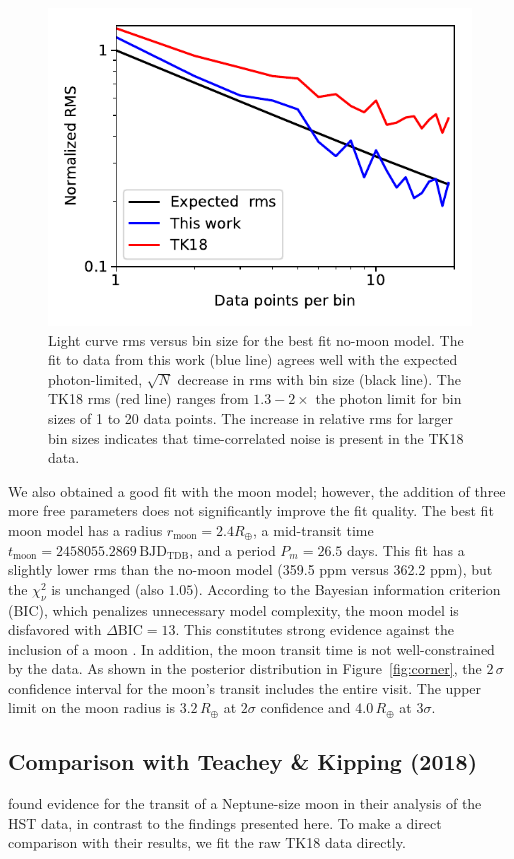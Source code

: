 \documentclass[twocolumn]{aastex62}
\begin{document}
\begin{figure}
\includegraphics[width = 0.5 \textwidth]{figures/fig2_rms.pdf}
    \caption{Light curve rms versus bin size for the best fit no-moon model. The fit to data from this work (blue line) agrees well with the expected photon-limited, $\sqrt{N}$ decrease in rms with bin size (black line). The TK18 rms (red line) ranges from $1.3 - 2\times$ the photon limit for bin sizes of 1 to 20 data points. The increase in relative rms for larger bin sizes indicates that time-correlated noise is present in the TK18 data.}
\label{fig:rms}
\end{figure}

We also obtained a good fit with the moon model; however, the addition of three more free parameters does not significantly improve the fit quality. The best fit moon model has a radius $r_\mathrm{moon} = 2.4R_\oplus$, a mid-transit time $t_\mathrm{moon} = 2458055.2869\,\mathrm{BJD_{TDB}}$, and a period $P_m = 26.5$ days. This fit has a slightly lower rms than the no-moon model (359.5 ppm versus 362.2 ppm), but the $\chi_\nu^2$ is unchanged (also $1.05$). According to the Bayesian information criterion (BIC), which penalizes unnecessary model complexity, the moon model is disfavored with $\Delta\mathrm{BIC} = 13$. This constitutes strong evidence against the inclusion of a moon \citep{kass95}.  In addition, the moon transit time is not well-constrained by the data. As shown in the posterior distribution in Figure~\ref{fig:corner}, the $2\,\sigma$ confidence interval for the moon's transit includes the entire visit.  The upper limit on the moon radius is $3.2\,R_\oplus$ at $2\sigma$ confidence and $4.0\,R_\oplus$ at $3\sigma$.

\subsection{Comparison with Teachey \& Kipping (2018)}
\cite{teachey18b} found evidence for the transit of a Neptune-size moon in their analysis of the HST data, in contrast to the findings presented here.  To make a direct comparison with their results, we fit the raw TK18 data directly. 
\end{document}
